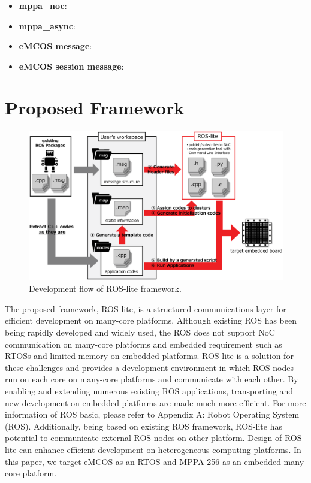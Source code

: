 \begin{itemize}
  \setlength{\leftskip}{-5mm}
  \item \textbf{mppa\_noc}:
  \item \textbf{mppa\_async}:
  \item \textbf{eMCOS message}:
  \item \textbf{eMCOS session message}:
\end{itemize}


\chapter{Proposed Framework}
\label{chap:proposed_framework}

\begin{figure}[!htbp]
  \centering
  \includegraphics[width=0.9\linewidth]{../figure/roslite/system_model.eps}
  \caption{\label{fig:rosl_system_model}
    Development flow of ROS-lite framework.}
\end{figure}

The proposed framework, ROS-lite, is a structured communications layer for efficient development on many-core platforms.
Although existing ROS has been being rapidly developed and widely used, the ROS does not support NoC communication on many-core platforms and embedded requirement such as RTOSs and limited memory on embedded platforms.
ROS-lite is a solution for these challenges and provides a development environment in which ROS nodes run on each core on many-core platforms and communicate with each other.
By enabling and extending numerous existing ROS applications, transporting and new development on embedded platforms are made much more efficient.
For more information of ROS basic, please refer to Appendix A: Robot Operating System (ROS).
Additionally, being based on existing ROS framework, ROS-lite has potential to communicate external ROS nodes on other platform.
Design of ROS-lite can enhance efficient development on heterogeneous computing platforms.
In this paper, we target eMCOS as an RTOS and MPPA-256 as an embedded many-core platform.

